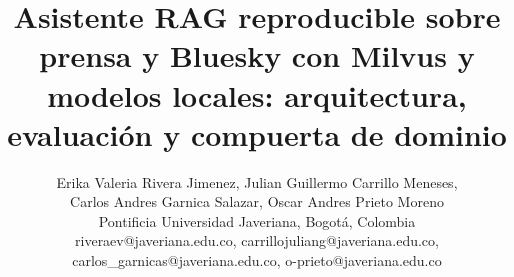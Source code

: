 \documentclass[journal]{IEEEtran}
\begin{document}
\makeatletter
\def\@Alph#1{\ifcase#1\or A\or B\or C\or D\or E\or F\or G\or H\or I\or J\or K\or L\or M\or N\or O\or P\or Q\or R\or S\or T\or U\or V\or W\or X\or Y\or Z\else\@ctrerr\fi}
\def\@alph#1{\ifcase#1\or a\or b\or c\or d\or e\or f\or g\or h\or i\or j\or k\or l\or m\or n\or o\or p\or q\or r\or s\or t\or u\or v\or w\or x\or y\or z\else\@ctrerr\fi}
\makeatother

\title{Asistente RAG reproducible sobre prensa y Bluesky con Milvus y modelos locales: arquitectura, evaluaci\'on y compuerta de dominio}

\author{Erika Valeria Rivera Jimenez, Julian Guillermo Carrillo Meneses,\\
Carlos Andres Garnica Salazar, Oscar Andres Prieto Moreno\\[0.4em]
\normalsize Pontificia Universidad Javeriana, Bogot\'a, Colombia\\
riveraev@javeriana.edu.co, carrillojuliang@javeriana.edu.co,\\
carlos\_garnicas@javeriana.edu.co, o-prieto@javeriana.edu.co}

\maketitle


















\end{document}
